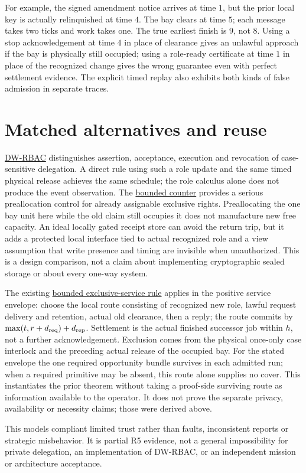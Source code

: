 \documentclass[11pt]{article}
\begin{document}
For example, the signed amendment notice arrives at time \(1\),
but the prior local key is actually relinquished at time \(4\).
The bay clears at time \(5\); each message takes two ticks and
work takes one. The true earliest finish is \(9\), not \(8\).
Using a stop acknowledgement at time \(4\) in place of clearance
gives an unlawful approach if the bay is physically still occupied;
using a role-ready certificate at time \(1\) in place of the
recognized change gives the wrong guarantee even with perfect
settlement evidence. The explicit timed replay also exhibits
both kinds of false admission in separate traces.

\section{Matched alternatives and reuse}
\href{https://www.ic.unicamp.br/~wainer/papers/is07.pdf}{DW-RBAC}
distinguishes assertion, acceptance, execution and revocation of
case-sensitive delegation. A direct rule using such a role update
and the same timed physical release achieves the same schedule;
the role calculus alone does not produce the event observation.
The \href{https://arxiv.org/abs/1503.09052}{bounded counter}
provides a serious preallocation control for already assignable
exclusive rights. Preallocating the one bay unit here while the old
claim still occupies it does not manufacture new free capacity.
An ideal locally gated receipt store can avoid the return trip,
but it adds a protected local interface tied to actual recognized
role and a view assumption that write presence and timing are
invisible when unauthorized. This is a design comparison, not a
claim about implementing cryptographic sealed storage or about
every one-way system.

The existing \href{https://github.com/eternal-november/eos-research-programmes/blob/main/projects/byzantine-control/exclusive-service/RULE.md}
{bounded exclusive-service rule} applies in the positive service
envelope: choose the local route consisting of recognized new
role, lawful request delivery and retention, actual old clearance,
then a reply; the route commits by
\(\max(t,r+d_{\rm req})+d_{\rm rep}\). Settlement is the actual
finished successor job within \(h\), not a further acknowledgement.
Exclusion comes from the physical once-only case interlock and
the preceding actual release of the occupied bay. For the stated
envelope the one required opportunity bundle survives in each
admitted run; when a required primitive may be absent, this route
alone supplies no cover. This instantiates the prior theorem
without taking a proof-side surviving route as information
available to the operator. It does not prove the separate
privacy, availability or necessity claims; those were derived above.

This models compliant limited trust rather than faults, inconsistent
reports or strategic misbehavior. It is partial R5 evidence, not a
general impossibility for private delegation, an implementation of
DW-RBAC, or an independent mission or architecture acceptance.
\end{document}
